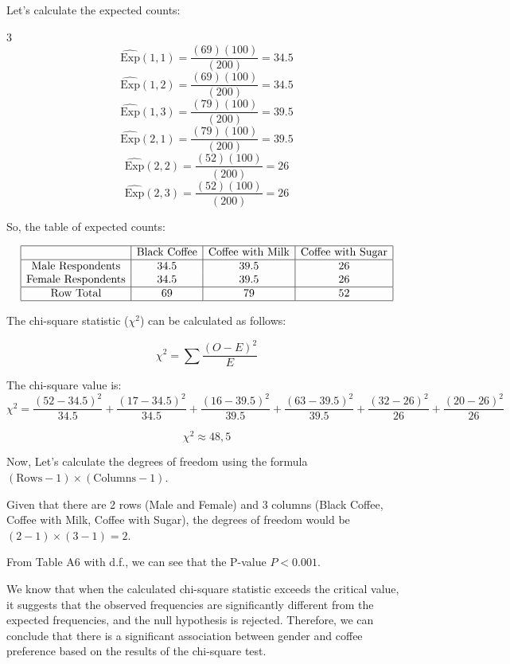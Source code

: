 \documentclass[12pt]{article}
\begin{document}
Let's calculate the expected counts:

\begin{multicols}{3}
    \noindent
    \[ \widehat{\text{Exp}}(1,1) = \frac{(69)(100)}{(200)} = 34.5 \]
    \[ \widehat{\text{Exp}}(1,2) = \frac{(69)(100)}{(200)} = 34.5 \]
    \[ \widehat{\text{Exp}}(1,3) = \frac{(79)(100)}{(200)} = 39.5\]
    \[ \widehat{\text{Exp}}(2,1) = \frac{(79)(100)}{(200)} = 39.5\]
    \[ \widehat{\text{Exp}}(2,2) = \frac{(52)(100)}{(200)} = 26 \]
    \[ \widehat{\text{Exp}}(2,3) = \frac{(52)(100)}{(200)} = 26 \]
\end{multicols}

So, the table of expected counts:

\[
\begin{array}{|c|c|c|c|}
\hline
& \text{Black Coffee} & \text{Coffee with Milk} & \text{Coffee with Sugar} \\
\hline
\text{Male Respondents} & 34.5 & 39.5 & 26 \\
\text{Female Respondents} & 34.5 & 39.5 & 26 \\
\hline
\text{Row Total} & 69 & 79 & 52 \\
\hline
\end{array}
\]

The chi-square statistic ($\chi^2$) can be calculated as follows:

\[
\chi^2 = \sum \frac{(O - E)^2}{E}
\]

The chi-square value is:
\[
\chi^2 =  \frac{(52 - 34.5)^2}{34.5} + \frac{(17 - 34.5)^2}{34.5} + \frac{(16 - 39.5)^2}{39.5}+\frac{(63 - 39.5)^2}{39.5}+\frac{(32 - 26)^2}{26}+\frac{(20 - 26)^2}{26}
\]

\[
\chi^2 \approx 48,5  
\]

Now, Let's calculate the degrees of freedom using the formula \( (\text{Rows} - 1) \times (\text{Columns} - 1) \).

Given that there are 2 rows (Male and Female) and 3 columns (Black Coffee, Coffee with Milk, Coffee with Sugar), the degrees of freedom would be \( (2 - 1) \times (3 - 1) = 2 \).

From Table A6 with d.f., we can see that the P-value $P < 0.001$. 

We know that when the calculated chi-square statistic exceeds the critical value, it suggests that the observed frequencies are significantly different from the expected frequencies, and the null hypothesis is rejected.
Therefore, we can conclude that there is a significant association between gender and coffee preference based on the results of the chi-square test.
\end{document}
